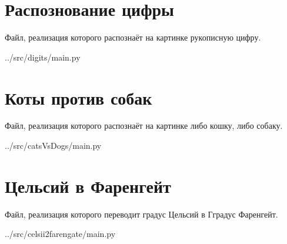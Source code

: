 
\section{Распознование цифры}

Файл, реализация которого распознаёт на картинке рукописную цифру.


{../src/digits/main.py}

\newpage


\section{Коты против собак}

Файл, реализация которого распознаёт на картинке либо кошку, либо собаку.


{../src/catsVsDogs/main.py}

\newpage


\section{Цельсий в Фаренгейт}

Файл, реализация которого переводит градус Цельсий в Гградус Фаренгейт.


{../src/celsii2farengate/main.py}

